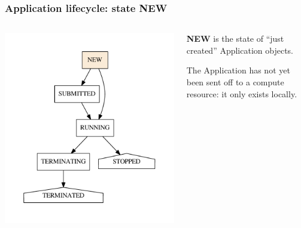 \documentclass[english,serif,mathserif,xcolor=pdftex,dvipsnames,table]{beamer}
\begin{document}
\begin{frame}[fragile]
\frametitle{Application lifecycle: state NEW}

\begin{columns}[c]
  \begin{column}{0.5\textwidth}
    \includegraphics[height=0.7\textheight]{fig/states-NEW}
  \end{column}
  \begin{column}{0.5\textwidth}
    \raggedleft
    \textbf{NEW} is the state of ``just created'' Application objects.

    \+
    The Application has not yet been sent off to a compute
    resource: it only exists locally.
  \end{column}
\end{columns}
\end{frame}
\end{document}
